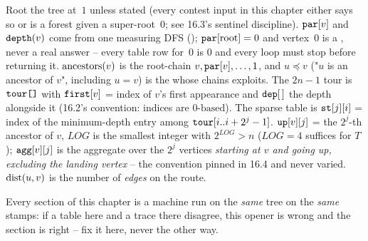 Root the tree at~\(1\) unless stated (every contest input in this chapter
either says so or is a forest given a super-root~\(0\); see 16.3's
sentinel discipline).  \(\texttt{par}[v]\) and \(\texttt{depth}(v)\) come from
one measuring DFS (); \(\texttt{par}[\text{root}]=0\) and
vertex~\(0\) is a , never a real answer -- every table row
for~\(0\) is \(0\) and every loop must stop before returning it.
\(\operatorname{ancestors}(v)\) is the root-chain \(v, \texttt{par}[v], \dots, 1\), and
\(u\preceq v\) ("\(u\) is an ancestor of \(v\)", including \(u=v\)) is the
 whose chains  exploits.  The
\(2n-1\) tour is \(\texttt{tour[]}\) with \(\texttt{first}[v]\) = index of
\(v\)'s first appearance and \(\texttt{dep}[\,]\) the depth alongside it
(16.2's convention: indices are \(\text{0-based}\)).  The sparse table is
\(\texttt{st}[j][i]\) = index of the minimum-depth entry among
\(\texttt{tour}[i..i+2^j-1]\).  \(\texttt{up}[v][j]\) = the \(2^j\)-th
ancestor of \(v\), \(\mathit{LOG}\) is the smallest integer with
\(2^{\mathit{LOG}}>n\) (\(\mathit{LOG}=4\) suffices for \(T\)); \(\texttt{agg}[v][j]\) is
the aggregate over the \(2^j\) vertices \emph{starting at \(v\) and going
up, excluding the landing vertex} -- the convention pinned in 16.4 and
never varied.  \(\operatorname{dist}(u,v)\) is the number of \emph{edges} on the route.

Every section of this chapter is a machine run on the \emph{same} tree on
the \emph{same} stamps: if a table here and a trace there disagree, this
opener is wrong and the section is right -- fix it here, never the other
way.

